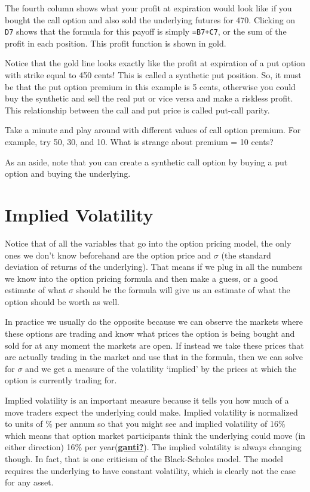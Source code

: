 \documentclass[
]{book}
\begin{document}
The fourth column shows what your profit at expiration would look like if you bought the call option and also sold the underlying futures for 470. Clicking on \texttt{D7} shows that the formula for this payoff is simply \texttt{=B7+C7}, or the sum of the profit in each position. This profit function is shown in gold.

Notice that the gold line looks exactly like the profit at expiration of a put option with strike equal to 450 cents! This is called a synthetic put position. So, it must be that the put option premium in this example is 5 cents, otherwise you could buy the synthetic and sell the real put or vice versa and make a riskless profit. This relationship between the call and put price is called put-call parity.

Take a minute and play around with different values of call option premium. For example, try 50, 30, and 10. What is strange about premium = 10 cents?

As an aside, note that you can create a synthetic call option by buying a put option and buying the underlying.

\hypertarget{implied-volatility}{%
\section{Implied Volatility}\label{implied-volatility}}

Notice that of all the variables that go into the option pricing model, the only ones we don't know beforehand are the option price and \(\sigma\) (the standard deviation of returns of the underlying). That means if we plug in all the numbers we know into the option pricing formula and then make a guess, or a good estimate of what \(\sigma\) should be the formula will give us an estimate of what the option should be worth as well.

In practice we usually do the opposite because we can observe the markets where these options are trading and know what prices the option is being bought and sold for at any moment the markets are open. If instead we take these prices that are actually trading in the market and use that in the formula, then we can solve for \(\sigma\) and we get a measure of the volatility `implied' by the prices at which the option is currently trading for.

Implied volatility is an important measure because it tells you how much of a move traders expect the underlying could make. Implied volatility is normalized to units of \% per annum so that you might see and implied volatility of 16\% which means that option market participants think the underlying could move (in either direction) 16\% per year(\protect\hyperlink{ref-ganti}{\textbf{ganti?}}). The implied volatility is always changing though. In fact, that is one criticism of the Black-Scholes model. The model requires the underlying to have constant volatility, which is clearly not the case for any asset.
\end{document}
